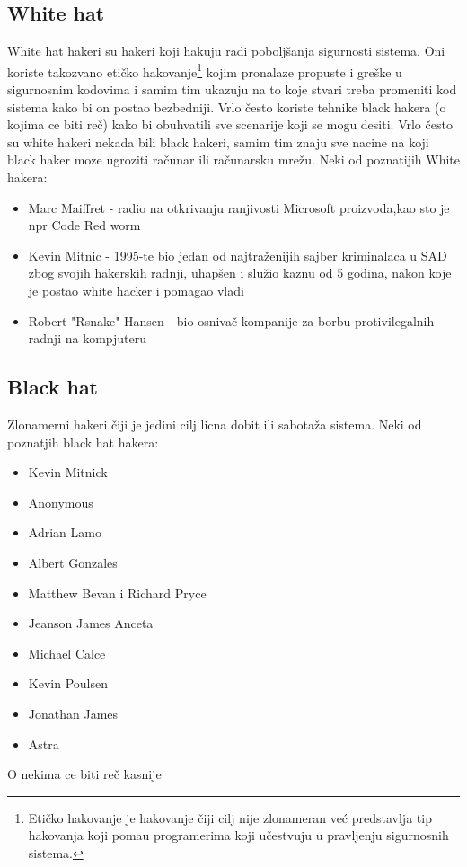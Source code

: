 \documentclass[a4paper]{article}
\begin{document}
\subsection{White hat}
\label{subsec:podnaslov1}
White hat hakeri su hakeri koji hakuju radi poboljšanja sigurnosti sistema. Oni koriste takozvano etičko hakovanje\footnote{Etičko hakovanje je hakovanje čiji cilj nije zlonameran već predstavlja tip hakovanja koji pomau programerima koji učestvuju u pravljenju sigurnosnih sistema.} kojim pronalaze propuste i greške u sigurnosnim kodovima i samim tim ukazuju na to koje stvari treba promeniti kod sistema kako bi on postao bezbedniji. Vrlo često koriste tehnike black hakera (o kojima ce biti reč) kako bi obuhvatili sve scenarije koji se mogu desiti. Vrlo često su white hakeri nekada bili black hakeri, samim tim znaju sve nacine na koji black haker moze ugroziti računar ili računarsku mrežu.
\newline
\newline
Neki od poznatijih White hakera:
\begin{itemize}
	\item Marc Maiffret - radio na otkrivanju ranjivosti Microsoft proizvoda,kao sto je npr Code Red worm
	\item Kevin Mitnic - 1995-te bio jedan od najtraženijih sajber kriminalaca u SAD zbog svojih hakerskih radnji, uhapšen i služio kaznu od 5 godina, nakon koje je postao white hacker i pomagao vladi
	\item Robert "Rsnake" Hansen - bio osnivač kompanije za borbu protivilegalnih radnji na kompjuteru
\end{itemize}
\subsection{Black hat}
\label{subsec:podnaslov2}
Zlonamerni hakeri čiji je jedini cilj licna dobit ili sabotaža sistema.
\newline
Neki od poznatjih black hat hakera:
\begin{itemize}
	\item Kevin Mitnick
	\item Anonymous
	\item Adrian Lamo
	\item Albert Gonzales
	\item Matthew Bevan i Richard Pryce
	\item Jeanson James Anceta
	\item Michael Calce
	\item Kevin Poulsen
	\item Jonathan James
	\item Astra
\end{itemize}
O nekima ce biti reč kasnije
\end{document}

